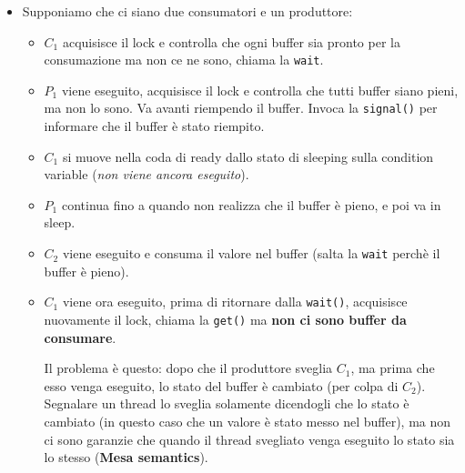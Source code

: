 \documentclass[12pt, letterpaper]{article}
\begin{document}
				\begin{itemize}
					\item Supponiamo che ci siano due consumatori e un produttore:
					\begin{itemize}
						\item $C_1$ acquisisce il lock e controlla che ogni buffer sia pronto per la consumazione ma non ce ne sono, chiama la \texttt{wait}. 
						\item $P_1$ viene eseguito, acquisisce il lock e controlla che tutti buffer siano pieni, ma non lo sono. Va avanti riempendo il buffer. Invoca la \texttt{signal()} per informare che il buffer è stato riempito.
						\item $C_1$ si muove nella coda di ready dallo stato di sleeping sulla condition variable (\textit{non viene ancora eseguito}). 
						\item $P_1$ continua fino a quando non realizza che il buffer è pieno, e poi va in sleep.
						\item $C_2$ viene eseguito e consuma il valore nel buffer (salta la \texttt{wait} perchè il buffer è pieno).
						\item $C_1$ viene ora eseguito, prima di ritornare dalla \texttt{wait()}, acquisisce nuovamente il lock, chiama la \texttt{get()} ma \textbf{non ci sono buffer da consumare}.
						
						Il problema è questo: dopo che il produttore sveglia $C_1$, ma prima che esso venga eseguito, lo stato del buffer è cambiato (per colpa di $C_2$). Segnalare un thread lo sveglia solamente dicendogli che lo stato è cambiato (in questo caso che un valore è stato messo nel buffer), ma non ci sono garanzie che quando il thread svegliato venga eseguito lo stato sia lo stesso (\textbf{Mesa semantics}). 
						

\end{itemize}
\end{itemize}
\end{document}
